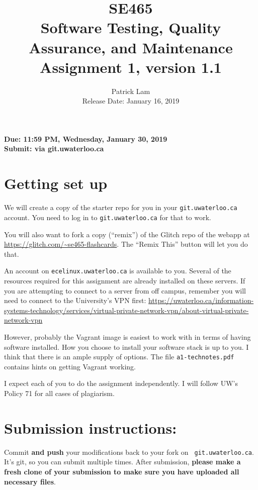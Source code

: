 \documentclass[10pt,hidelinks]{article}
\begin{document}
\title{
SE465 \\
Software Testing, Quality Assurance, and Maintenance\\
Assignment 1, version 1.1}
\author{Patrick Lam \\
{Release Date:  January 16, 2019} \\
}
\renewcommand{\today}{}
\maketitle

\begin{center}

{\bf Due:  11:59 PM, Wednesday, January 30, 2019} \\
{\bf Submit: via git.uwaterloo.ca }\\
\end{center}

\section*{Getting set up}
We will create a copy of the starter repo for you in your {\tt git.uwaterloo.ca} account. You need to log in to {\tt git.uwaterloo.ca} for that to work.

You will also want to fork a copy (``remix'') of the Glitch repo of the webapp at
\url{https://glitch.com/~se465-flashcards}. The ``Remix This'' button will let you do that.

An account on {\tt ecelinux.uwaterloo.ca} is available to you.
Several of the resources required for this assignment are already installed on these servers. If you are attempting to connect to a server from off campus, remember you will need to connect to the University's VPN first: \url{https://uwaterloo.ca/information-systems-technology/services/virtual-private-network-vpn/about-virtual-private-network-vpn}

However, probably the Vagrant image is easiest to work with in terms of having software installed. How you choose to install your software stack is up to you. I think that there is an ample supply of options. The file {\tt a1-technotes.pdf} contains hints on getting Vagrant working.

I expect each of you to do the assignment independently. I will follow UW's Policy 71 for all cases of plagiarism.
 
\newpage
 \section*{Submission instructions:} 
Commit {\bf and push} your modifications back to your fork on {\tt
  git.uwaterloo.ca}.  It's git, so you can submit multiple times. After
submission, {\bf please make a fresh clone of your submission to make sure you
  have uploaded all necessary files}.
 
\end{document}
